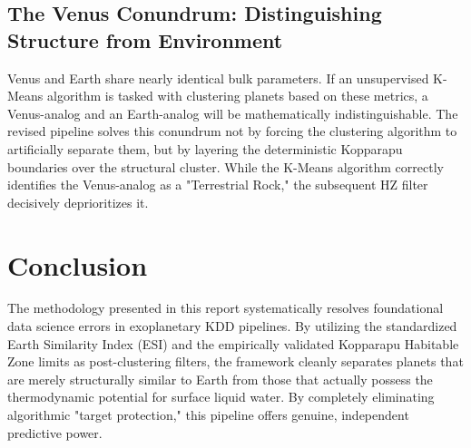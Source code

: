 \subsection{The Venus Conundrum: Distinguishing Structure from Environment}
Venus and Earth share nearly identical bulk parameters. If an unsupervised K-Means algorithm is tasked with clustering planets based on these metrics, a Venus-analog and an Earth-analog will be mathematically indistinguishable. The revised pipeline solves this conundrum not by forcing the clustering algorithm to artificially separate them, but by layering the deterministic Kopparapu boundaries over the structural cluster. While the K-Means algorithm correctly identifies the Venus-analog as a "Terrestrial Rock," the subsequent HZ filter decisively deprioritizes it.

\section{Conclusion}
The methodology presented in this report systematically resolves foundational data science errors in exoplanetary KDD pipelines. By utilizing the standardized Earth Similarity Index (ESI) and the empirically validated Kopparapu Habitable Zone limits as post-clustering filters, the framework cleanly separates planets that are merely structurally similar to Earth from those that actually possess the thermodynamic potential for surface liquid water. By completely eliminating algorithmic "target protection," this pipeline offers genuine, independent predictive power.
